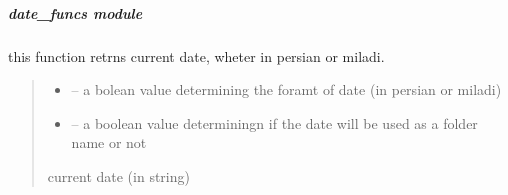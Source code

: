 \documentclass[letterpaper,10pt,english]{sphinxmanual}
\begin{document}
\sphinxstepscope


\subparagraph{date\_funcs module}
\label{\detokenize{setting/backend/date_funcs:module-oxin.backend.date_funcs}}\label{\detokenize{setting/backend/date_funcs:date-funcs-module}}\label{\detokenize{setting/backend/date_funcs::doc}}

\begin{savenotes}\begin{fulllineitems}
\label{\detokenize{setting/backend/date_funcs:oxin.backend.date_funcs.get_date}}
\pysigstartsignatures
{}
\pysigstopsignatures
\sphinxAtStartPar
this function retrns current date, wheter in persian or miladi.
\begin{quote}\begin{description}
\begin{itemize}
\item {} 
\sphinxAtStartPar
{} – a bolean value determining the foramt of date (in persian or miladi)

\item {} 
\sphinxAtStartPar
{} – a boolean value determiningn if the date will be used as a folder name or not

\end{itemize}

\sphinxAtStartPar
current date (in string)

\end{description}\end{quote}

\end{fulllineitems}\end{savenotes}

\end{document}
